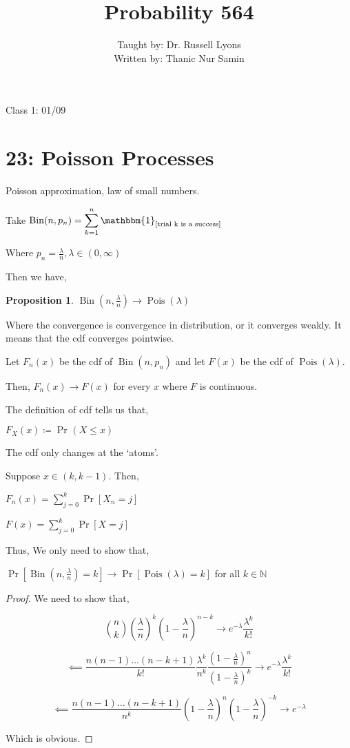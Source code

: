 \documentclass{article}
\title{Probability 564}
\author{Taught by: Dr. Russell Lyons \\ Written by: Thanic Nur Samin}
\date{\vspace{-5ex}}
\theoremstyle{definition}
\newtheorem{proposition}{Proposition}
\newcommand{\Bin}{\operatorname{Bin}}
\newcommand{\Pois}{\operatorname{Pois}}
\begin{document}
\maketitle

Class 1: 01/09

\section*{23: Poisson Processes}

Poisson approximation, law of small numbers.

Take \(\Bin(n,p_{n})=\displaystyle \sum_{k=1}^{n} \mathbbm{1}_{[\text{trial k is a success} ]} \)

Where \(p_{n} =\frac{\lambda}{n},\lambda \in (0,\infty)\) 

Then we have,

\begin{proposition}
    \(\Bin(n,\frac{\lambda}{n}) \to \Pois(\lambda)\)    
\end{proposition}

Where the convergence is convergence in distribution, or it converges weakly. It means that the cdf converges pointwise.

Let \(F_n(x)\) be the cdf of \(\Bin(n,p_{n})\) and let \(F(x)\) be the cdf of \(\Pois(\lambda)\).

Then, \(F_n(x)\to F(x)\) for every \(x\) where \(F\) is continuous.

The definition of cdf tells us that,

\(F_{X} (x)\coloneqq \Pr_{}(X\leq x) \) 

The cdf only changes at the `atoms'.

Suppose \(x\in (k,k-1)\). Then,

\(F_{n} (x)=\displaystyle \sum_{j=0}^{k} \Pr[X_{n} =j]\) 

\(F(x)=\displaystyle \sum_{j=0}^{k} \Pr[X=j]\)  

Thus, We only need to show that,

\(\Pr[\Bin(n,\frac{\lambda}{n})=k]\to \Pr[\Pois(\lambda)=k]\) for all \(k\in \mathbb{N}\)  

\begin{proof}
    We need to show that,

    \[
        \binom{n}{k} \left( \frac{\lambda}{n} \right)^k \left( 1-\frac{\lambda}{n} \right)^{n-k}  \to e^{-\lambda}\frac{\lambda^k}{k!}
    \]

    \[
        \impliedby \frac{n(n-1)\dots (n-k+1)}{k!}\frac{\lambda^k}{n^k}\frac{(1-\frac{\lambda}{n})^n}{(1-\frac{\lambda}{n})^k} \to e^{-\lambda}\frac{\lambda^k}{k!} 
    \]

    \[
        \impliedby \frac{n(n-1)\dots (n-k+1)}{n^k}\left(1-\frac{\lambda}{n}\right)^n \left(1-\frac{\lambda}{n}\right)^{-k} \to e^{-\lambda} 
    \]

    Which is obvious.

\end{proof}
\end{document}
